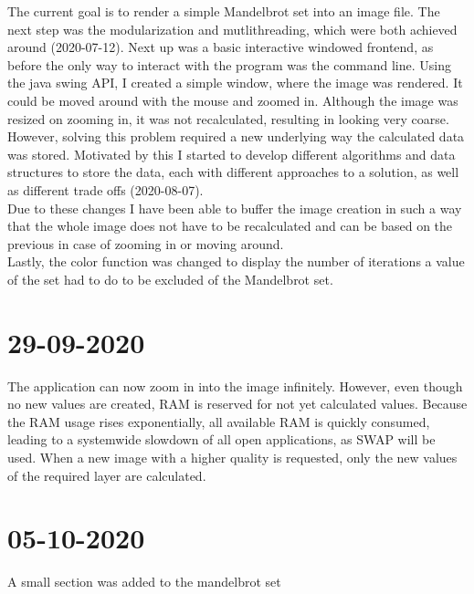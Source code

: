 \documentclass[10pt,a4paper]{article}
\begin{document}
	The current goal is to render a simple Mandelbrot set into an image file. The next step was the modularization and mutlithreading, which were both achieved around (2020-07-12). Next up was a basic interactive windowed frontend, as before the only way to interact with the program was the command line. Using the java swing API, I created a simple window, where the image was rendered. It could be moved around with the mouse and zoomed in. Although the image was resized on zooming in, it was not recalculated, resulting in looking very coarse. However, solving this problem required a new underlying way the calculated data was stored. Motivated by this I started to develop different algorithms and data structures to store the data, each with different approaches to a solution, as well as different trade offs (2020-08-07).\\
	Due to these changes I have been able to buffer the image creation in such a way that the whole image does not have to be recalculated and can be based on the previous in case of zooming in or moving around.\\
	Lastly, the color function was changed to display the number of iterations a value of the set had to do to be excluded of the Mandelbrot set.
	\section{29-09-2020}
	The application can now zoom in into the image infinitely. However, even though no new values are created, RAM is reserved for not yet calculated values. Because the RAM usage rises exponentially, all available RAM is quickly consumed, leading to a systemwide slowdown of all open applications, as SWAP will be used.
	When a new image with a higher quality is requested, only the new values of the required layer are calculated. 
	\section{05-10-2020}
	A small section was added to the mandelbrot set
\end{document}

